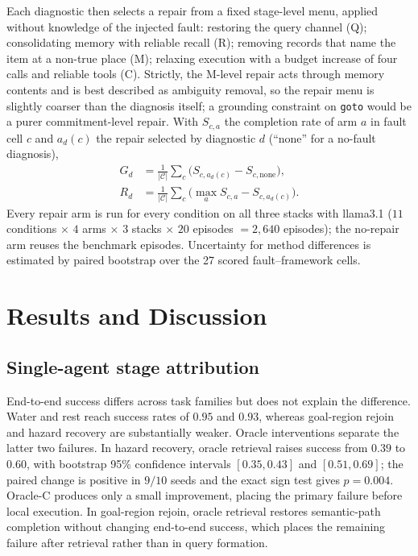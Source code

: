 \documentclass[letterpaper]{article} %
\newcommand{\method}[1]{\texttt{#1}}
\begin{document}
Each diagnostic then selects a repair from a fixed stage-level menu,
applied without knowledge of the injected fault: restoring the query
channel (Q); consolidating memory with reliable recall (R); removing
records that name the item at a non-true place (M); relaxing
execution with a budget increase of four calls and reliable tools
(C). Strictly, the M-level repair acts through memory contents and
is best described as ambiguity removal, so the repair menu is
slightly coarser than the diagnosis itself; a grounding constraint
on \method{goto} would be a purer commitment-level repair. With
$S_{c,a}$ the completion rate of arm $a$ in fault cell $c$ and
$a_d(c)$ the repair selected by diagnostic $d$ (``none'' for a
no-fault diagnosis),
\begin{equation}
\begin{aligned}
G_d&=\tfrac{1}{|\mathcal{C}|}\textstyle\sum_{c}\bigl(S_{c,a_d(c)}-S_{c,\mathrm{none}}\bigr),\\
R_d&=\tfrac{1}{|\mathcal{C}|}\textstyle\sum_{c}\bigl(\max_a S_{c,a}-S_{c,a_d(c)}\bigr).
\end{aligned}
\end{equation}
Every repair arm is run for every condition on all three stacks with
llama3.1 ($11$ conditions $\times$ $4$ arms $\times$ $3$ stacks
$\times$ $20$ episodes $=2{,}640$ episodes); the no-repair arm
reuses the benchmark episodes. Uncertainty for method differences is
estimated by paired bootstrap over the 27 scored fault--framework
cells.

\section{Results and Discussion}
\label{sec:results}

\subsection{Single-agent stage attribution}
\label{sec:single}

End-to-end success differs across task families but does not explain the difference. Water and rest reach success rates of $0.95$ and $0.93$, whereas goal-region rejoin and hazard recovery are substantially weaker. Oracle interventions separate the latter two failures. In hazard recovery, oracle retrieval raises success from $0.39$ to $0.60$, with bootstrap 95\% confidence intervals $[0.35,0.43]$ and $[0.51,0.69]$; the paired change is positive in $9/10$ seeds and the exact sign test gives $p=0.004$. Oracle-C produces only a small improvement, placing the primary failure before local execution. In goal-region rejoin, oracle retrieval restores semantic-path completion without changing end-to-end success, which places the remaining failure after retrieval rather than in query formation.
\end{document}
